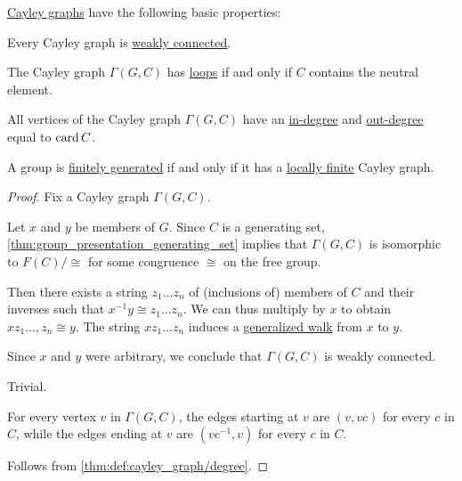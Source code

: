 \begin{proposition}\label{thm:def:cayley_graph}
  \hyperref[def:cayley_graph]{Cayley graphs} have the following basic properties:
  \begin{thmenum}
     Every Cayley graph is \hyperref[def:graph_connectedness/weak]{weakly connected}.

     The Cayley graph \( \Gamma(G, C) \) has \hyperref[def:directed_multigraph/loop]{loops} if and only if \( C \) contains the neutral element.

     All vertices of the Cayley graph \( \Gamma(G, C) \) have an \hyperref[def:graph_cardinality/directed_degree]{in-degree} and \hyperref[def:graph_cardinality/directed_degree]{out-degree} equal to \( \operatorname{card} C \).

     A group is \hyperref[def:group_presentation]{finitely generated} if and only if it has a \hyperref[def:graph_cardinality/local]{locally finite} Cayley graph.
  \end{thmenum}
\end{proposition}
\begin{proof}
   Fix a Cayley graph \( \Gamma(G, C) \).

  Let \( x \) and \( y \) be members of \( G \). Since \( C \) is a generating set, \cref{thm:group_presentation_generating_set} implies that \( \Gamma(G, C) \) is isomorphic to \( F(C) / {\cong} \) for some congruence \( {\cong} \) on the free group.

  Then there exists a string \( z_1 \ldots z_n \) of (inclusions of) members of \( C \) and their inverses such that \( x^{-1} y \cong z_1 \ldots z_n \). We can thus multiply by \( x \) to obtain \( x z_1 \ldots, z_n \cong y \). The string \( x z_1 \ldots z_n \) induces a \hyperref[def:graph_walk/generalized]{generalized walk} from \( x \) to \( y \).

  Since \( x \) and \( y \) were arbitrary, we conclude that \( \Gamma(G, C) \) is weakly connected.

   Trivial.

   For every vertex \( v \) in \( \Gamma(G, C) \), the edges starting at \( v \) are \( (v, vc) \) for every \( c \) in \( C \), while the edges ending at \( v \) are \( (vc^{-1}, v) \) for every \( c \) in \( C \).

   Follows from \cref{thm:def:cayley_graph/degree}.
\end{proof}

